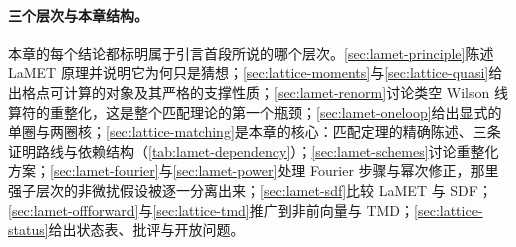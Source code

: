 \paragraph{三个层次与本章结构。}
本章的每个结论都标明属于引言首段所说的哪个层次。\cref{sec:lamet-principle}陈述 LaMET 原理并说明它为何只是猜想；\cref{sec:lattice-moments}与\cref{sec:lattice-quasi}给出格点可计算的对象及其严格的支撑性质；\cref{sec:lamet-renorm}讨论类空 Wilson 线算符的重整化，这是整个匹配理论的第一个瓶颈；\cref{sec:lamet-oneloop}给出显式的单圈与两圈核；\cref{sec:lattice-matching}是本章的核心：匹配定理的精确陈述、三条证明路线与依赖结构（\cref{tab:lamet-dependency}）；\cref{sec:lamet-schemes}讨论重整化方案；\cref{sec:lamet-fourier}与\cref{sec:lamet-power}处理 Fourier 步骤与幂次修正，那里强子层次的非微扰假设被逐一分离出来；\cref{sec:lamet-sdf}比较 LaMET 与 SDF；\cref{sec:lamet-offforward}与\cref{sec:lattice-tmd}推广到非前向量与 TMD；\cref{sec:lattice-status}给出状态表、批评与开放问题。
